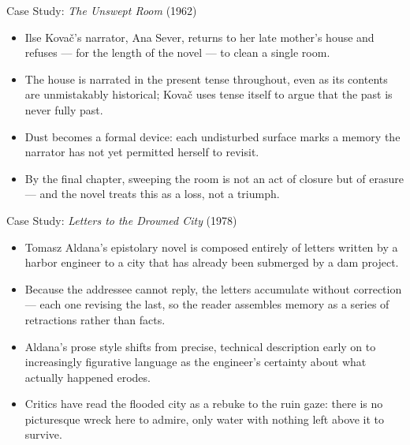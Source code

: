 \documentclass[aspectratio=169]{beamer}
\begin{document}
\begin{frame}{Case Study: \textit{The Unswept Room} (1962)}
\begin{itemize}
  \item Ilse Kova\v{c}'s narrator, Ana Sever, returns to her late mother's house and refuses --- for the length of the novel --- to clean a single room.
  \item The house is narrated in the present tense throughout, even as its contents are unmistakably historical; Kova\v{c} uses tense itself to argue that the past is never fully past.
  \item Dust becomes a formal device: each undisturbed surface marks a memory the narrator has not yet permitted herself to revisit.
  \item By the final chapter, sweeping the room is not an act of closure but of erasure --- and the novel treats this as a loss, not a triumph.
\end{itemize}
\end{frame}

\begin{frame}{Case Study: \textit{Letters to the Drowned City} (1978)}
\begin{itemize}
  \item Tomasz Aldana's epistolary novel is composed entirely of letters written by a harbor engineer to a city that has already been submerged by a dam project.
  \item Because the addressee cannot reply, the letters accumulate without correction --- each one revising the last, so the reader assembles memory as a series of retractions rather than facts.
  \item Aldana's prose style shifts from precise, technical description early on to increasingly figurative language as the engineer's certainty about what actually happened erodes.
  \item Critics have read the flooded city as a rebuke to the ruin gaze: there is no picturesque wreck here to admire, only water with nothing left above it to survive.
\end{itemize}
\end{frame}
\end{document}
